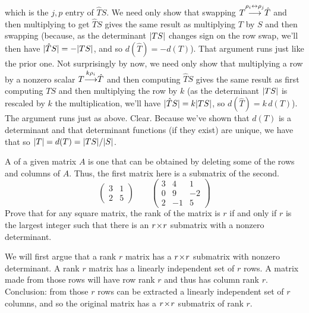 \begin{exercises}
\begin{answer}
\begin{exparts}
          which is the \( j,p \) entry of \( \hat{T}S \).
        \partsitem We need only show that swapping
          $
            T\smash[b]{\mathrel{ \mathop{\longrightarrow}\limits^{\rho_i\leftrightarrow\rho_j\mathstrut}_{ \begin{subarray}{l} \relax \end{subarray}}}}\hat{T}
          $
          and then multiplying to get \( \hat{T}S \) gives the same result as
          multiplying \( T \) by \( S \) and then swapping (because,
          as the determinant \( \deter{TS} \) changes sign on
          the row swap, we'll then have \( \deter{\hat{T}S}=-\deter{TS} \),
          and so \( d(\hat{T})=-d(T) \)).
          That argument runs just like the prior one.
        \partsitem Not surprisingly by now, we need only show that 
          multiplying a row by a nonzero scalar
          $
            T\smash[b]{\mathrel{ \mathop{\longrightarrow}\limits^{k\rho_i\mathstrut}_{ \begin{subarray}{l} \relax \end{subarray}}}}\hat{T}
          $
          and then computing \( \hat{T}S \) gives the same result as
          first computing \( TS \) and then multiplying the row by \( k \)
          (as the determinant \( \deter{TS} \) is rescaled by \( k \)
          the multiplication, we'll have \( \deter{\hat{T}S}=k\deter{TS} \),
          so \( d(\hat{T})=k\,d(T) \)).
          The argument runs just as above.
        \partsitem Clear.
        \partsitem Because we've shown that \( d(T) \) is a determinant
          and that determinant functions (if they exist) are
          unique, we have that
          so \( \deter{T}=d(T)=\deter{TS}/\deter{S} \).
      \end{exparts}  
    \end{answer}
  \item 
    A  
    of a given matrix $A$ is one that can be obtained by deleting 
    some of the rows and columns of $A$.
    Thus, the first matrix here is a submatrix of the second.
    \begin{equation*}
      \begin{pmatrix}
        3  &1  \\
        2  &5
      \end{pmatrix}
      \qquad
      \begin{pmatrix}
        3  &4  &1  \\
        0  &9  &-2 \\
        2  &-1 &5
      \end{pmatrix}
    \end{equation*}
    Prove that for any square matrix,
    the rank of the matrix is $r$ if and only if
    \( r \) is the largest
    integer such that there is an \( r \! \times \! r \) submatrix with a nonzero
    determinant.
    \begin{answer}
      We will first argue that a rank \( r \) matrix has a \( r \! \times \! r \)
      submatrix with nonzero determinant.
      A rank \( r \) matrix has a linearly independent set of \( r \) rows.
      A matrix made from those rows will have row rank \( r \) and thus has
      column rank \( r \).
      Conclusion: from those \( r \) rows can be extracted a linearly
      independent set of \( r \) columns, and so the original matrix has a
      \( r \! \times \! r \) submatrix of rank \( r \).


\end{answer}
\end{exercises}
